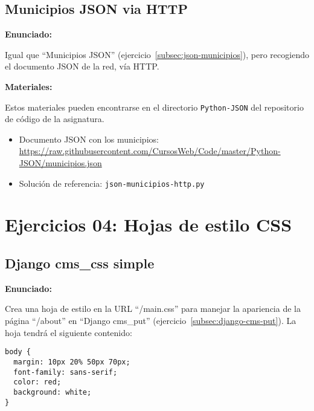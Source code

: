 \subsection{Municipios JSON via HTTP}
\label{subsec:json-municipios-http}

\textbf{Enunciado:}

Igual que ``Municipios JSON'' (ejercicio~\ref{subsec:json-municipios}),
pero recogiendo el documento JSON de la red, vía HTTP.

\textbf{Materiales:}

Estos materiales pueden encontrarse en el
directorio \verb|Python-JSON| del repositorio de código de la
asignatura. 

\begin{itemize}
\item Documento JSON con los municipios: \\
  \url{https://raw.githubusercontent.com/CursosWeb/Code/master/Python-JSON/municipios.json}
\item Solución de referencia: \verb|json-municipios-http.py|
\end{itemize}


\section{Ejercicios 04: Hojas de estilo CSS}

\subsection{Django cms\_css simple}
\label{subsec:django-cms-css}

\textbf{Enunciado:}

Crea una hoja de estilo en la URL ``/main.css'' para manejar la apariencia de la página ``/about'' en ``Django cms\_put'' (ejercicio~\ref{subsec:django-cms-put}). La hoja tendrá el siguiente contenido:

\begin{verbatim}
body {
  margin: 10px 20% 50px 70px;
  font-family: sans-serif;
  color: red;
  background: white;
}
\end{verbatim}

